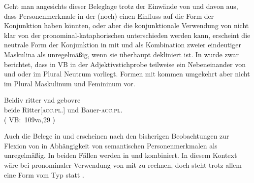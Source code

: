 Geht man angesichts dieser Beleglage trotz der Einwände von
\citet{gjelsten1980} und \citet{ksw2} davon aus, dass
Personenmerkmale in der \KC{} (noch) einen Einfluss auf die
Form der Konjunktion haben könnten, oder aber die konjunktionale Verwendung von
 nicht klar von der pronominal-kataphorischen
unterschieden werden kann, erscheint die neutrale Form der
Konjunktion in  mit   und
  als Kombination zweier eindeutiger Maskulina als
unregelmäßig, wenn sie überhaupt dekliniert ist. In
 wurde zwar berichtet, dass in VB in der
Adjektivstichprobe teilweise ein Nebeneinander von  und 
oder  im Plural Neutrum vorliegt. Formen mit
 kommen umgekehrt aber nicht im Plural Maskulinum und Femininum vor.

\begin{exe}
\ex\label{ex:rittergebure}
	\gll Beidiv ritter vnd gebovre \\
		beide Ritter[\textsc{acc.pl.\MascM}] und Bauer-\textsc{acc.pl.\MascM} \\
	\trans {}
		(%
			VB:~109va,29%
		)
\end{exe}

Auch die Belege in  und  erscheinen
nach den bisherigen Beobachtungen zur Flexion von  in Abhängigkeit
von semantischen Personenmerkmalen
als unregelmäßig. In beiden Fällen werden in
  und  kombiniert. In diesem
Kontext wäre bei pronominaler Verwendung von  mit
 zu rechnen, doch steht trotz allem eine Form vom Typ 
statt .

